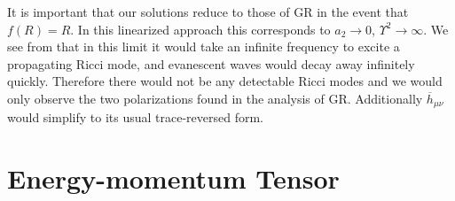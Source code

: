 It is important that our solutions reduce to those of GR in the event that $f(R) = R$. In this linearized approach this corresponds to $a_2 \rightarrow 0$, $\Upsilon^2 \rightarrow \infty$. We see from  that in this limit it would take an infinite frequency to excite a propagating Ricci mode, and evanescent waves would decay away infinitely quickly. Therefore there would not be any detectable Ricci modes and we would only observe the two polarizations found in the analysis of GR. Additionally $\overline{h}_{\mu\nu}$ would simplify to its usual trace-reversed form.

\section{Energy-momentum Tensor}\label{sec:EM_tensor}


